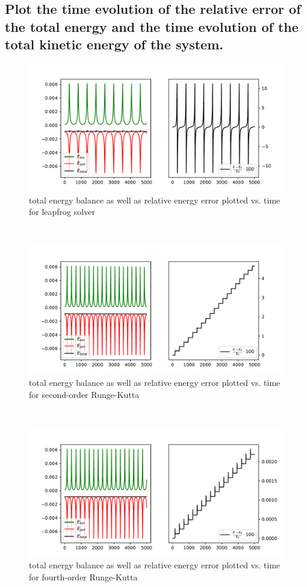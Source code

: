    \subsection{ Plot the time evolution of the relative error 
        of the total energy and the time evolution of the total kinetic
        energy of the system.}
    \begin{figure}[h!]
        \centering
        \includegraphics[width=\textwidth]{./figures/task1_1_energies_lf_test.pdf}
        \caption{total energy balance as well as relative energy error plotted 
            vs. time for leapfrog solver}
    \end{figure} \ \\ 
    \begin{figure}[h!]
        \centering
        \includegraphics[width=\textwidth]{./figures/task1_1_energies_rk2.pdf}
        \caption{total energy balance as well as relative energy error plotted 
            vs. time for second-order Runge-Kutta}
    \end{figure} \ \\ 
    \begin{figure}[h!]
        \centering
        \includegraphics[width=\textwidth]{./figures/task1_1_energies_rk4.pdf}
        \caption{total energy balance as well as relative energy error plotted 
            vs. time for fourth-order Runge-Kutta}
    \end{figure} \ \\ 
